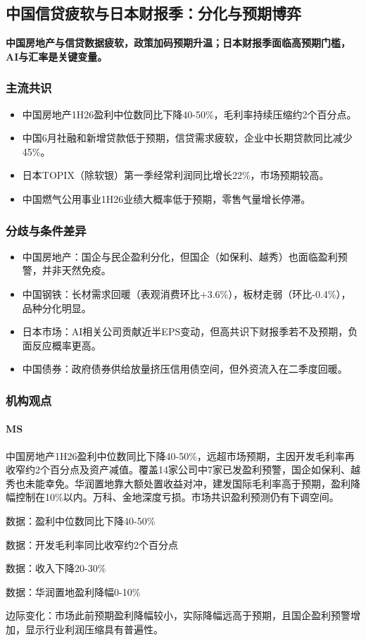 \documentclass[11pt]{ctexart}
\begin{document}
\subsection{中国信贷疲软与日本财报季：分化与预期博弈}
\textbf{中国房地产与信贷数据疲软，政策加码预期升温；日本财报季面临高预期门槛，AI与汇率是关键变量。}
\subsubsection*{主流共识}
\begin{itemize}
  \item 中国房地产1H26盈利中位数同比下降40-50\%，毛利率持续压缩约2个百分点。
  \item 中国6月社融和新增贷款低于预期，信贷需求疲软，企业中长期贷款同比减少45\%。
  \item 日本TOPIX（除软银）第一季经常利润同比增长22\%，市场预期较高。
  \item 中国燃气公用事业1H26业绩大概率低于预期，零售气量增长停滞。
\end{itemize}
\subsubsection*{分歧与条件差异}
\begin{itemize}
  \item 中国房地产：国企与民企盈利分化，但国企（如保利、越秀）也面临盈利预警，并非天然免疫。
  \item 中国钢铁：长材需求回暖（表观消费环比+3.6\%），板材走弱（环比-0.4\%），品种分化明显。
  \item 日本市场：AI相关公司贡献近半EPS变动，但高共识下财报季若不及预期，负面反应概率更高。
  \item 中国债券：政府债券供给放量挤压信用债空间，但外资流入在二季度回暖。
\end{itemize}
\subsubsection*{机构观点}
\paragraph{MS} 中国房地产1H26盈利中位数同比下降40-50\%，远超市场预期，主因开发毛利率再收窄约2个百分点及资产减值。覆盖14家公司中7家已发盈利预警，国企如保利、越秀也未能幸免。华润置地靠大额处置收益对冲，建发国际毛利率高于预期，盈利降幅控制在10\%以内。万科、金地深度亏损。市场共识盈利预测仍有下调空间。
{\small\color{refgray}数据：盈利中位数同比下降40-50\%\par}
{\small\color{refgray}数据：开发毛利率同比收窄约2个百分点\par}
{\small\color{refgray}数据：收入下降20-30\%\par}
{\small\color{refgray}数据：华润置地盈利降幅0-10\%\par}
{\small\color{refgray}边际变化：市场此前预期盈利降幅较小，实际降幅远高于预期，且国企盈利预警增加，显示行业利润压缩具有普遍性。\par}
\end{document}
